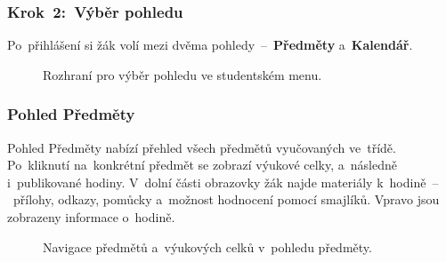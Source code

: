 \documentclass[male,czech,api_bc]{kitheses}
\begin{document}
\newpage

\subsubsection{Krok~2:~Výběr pohledu}
Po~přihlášení si žák volí mezi dvěma pohledy~--~\textbf{Předměty} a~\textbf{Kalendář}.

\begin{figure}[H]
	\centering
	\caption{Rozhraní pro výběr pohledu ve studentském menu.}
	\label{fig:manual-6}
\end{figure}

\subsubsection{Pohled Předměty}
Pohled Předměty nabízí přehled všech předmětů vyučovaných ve~třídě. Po~kliknutí na~konkrétní předmět se zobrazí výukové celky, a~následně i~publikované hodiny. V~dolní části obrazovky žák najde materiály k~hodině~--~přílohy, odkazy, pomůcky a~možnost hodnocení pomocí smajlíků. Vpravo jsou zobrazeny informace o~hodině.

\begin{figure}[H]
	\centering
	\caption{Navigace předmětů a~výukových celků v~pohledu předměty.}
	\label{fig:manual-7}
\end{figure}
\end{document}
